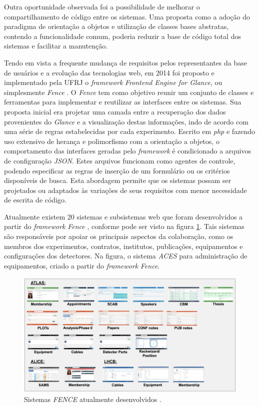 Outra oportunidade observada foi a possibilidade de melhorar o compartilhamento de código entre os sistemas. Uma proposta como a adoção do paradigma de orientação a objetos e utilização de classes bases abstratas, contendo a funcionalidade comum, poderia reduzir a base de código total dos sistemas e facilitar a manutenção.

Tendo em vista a frequente mudança de requisitos pelos representantes da base de usuários e a evolução das tecnologias web, em 2014 foi proposto e implementado pela UFRJ o \emph{framework} \emph{Frontend Engine for Glance}, ou simplesmente \emph{Fence} \cite{lange}. O \emph{Fence} tem como objetivo reunir um conjunto de classes e ferramentas para implementar e reutilizar as interfaces entre os sistemas. Sua proposta inicial era projetar uma camada entre a recuperação dos dados provenientes do \emph{Glance} e a visualização destas informações, indo de acordo com uma série de regras estabelecidas por cada experimento. Escrito em \emph{php} e fazendo uso extensivo de herança e polimorfismo com a orientação a objetos, o comportamento das interfaces geradas pelo \emph{framework} é condicionado a arquivos de configuração \emph{JSON}. Estes arquivos funcionam como agentes de controle, podendo especificar as regras de inserção de um formulário ou os critérios disponíveis de busca. Esta abordagem permite que os sistemas possam ser projetados ou adaptados às variações de seus requisitos com menor necessidade de escrita de código.

Atualmente existem 20 sistemas e subsistemas web que foram desenvolvidos a partir do \emph{framework} \emph{Fence} \cite{fence}, conforme pode ser visto na figura \ref{fig:aces-websystem}. Tais sistemas são responsáveis por apoiar os principais aspectos da colaboração, como os membros dos experimentos, contratos, institutos, publicações, equipamentos e configurações dos detectores. Na figura, o sistema \emph{ACES} para administração de equipamentos, criado a partir do \emph{framework} \emph{Fence}.

\begin{figure}[H]
    \centering
    \includegraphics[width=15cm]{source/2-contextualizacao/images/sistemas-fence.png}
    \caption{Sistemas \emph{FENCE} atualmente desenvolvidos \cite{pinhao}.}
    \label{fig:aces-websystem}
\end{figure}